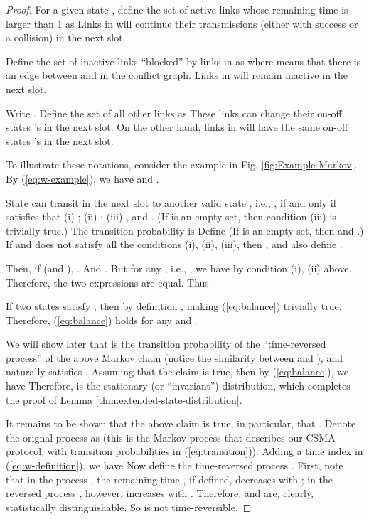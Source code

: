 \documentclass{IEEEtran}
\begin{document}
\begin{proof}
For a given state , define
the set of active links whose remaining time is larger than 1 as
Links in  will continue their transmissions (either with
success or a collision) in the next slot. 

Define the set of inactive links {}``blocked'' by links in 
as
where  means that there is an edge between  and 
in the conflict graph. Links in  will remain inactive
in the next slot. 

Write . Define the
set of all other links as
These links can change their on-off states 's in the next
slot. On the other hand, links in  will have the
same on-off states 's in the next slot.

To illustrate these notations, consider the example in Fig. \ref{fig:Example-Markov}.
By (\ref{eq:w-example}), we have 
and .

State  can transit in the next slot to another valid state ,
i.e., , if and only if  satisfies that (i) ;
(ii) ;
(iii) ,
and . (If 
is an empty set, then condition (iii) is trivially true.) The transition
probability is 
Define
(If  is an empty set, then  and .)
If  and  does not satisfy all the conditions (i), (ii), (iii),
then , and also define . 

Then, if  (and ), .
And .
But for any , i.e., , we have
 by condition (i), (ii) above. Therefore,
the two expressions are equal. Thus


If two states  satisfy , then by definition ,
making (\ref{eq:balance}) trivially true. Therefore, (\ref{eq:balance})
holds for any  and .

We will show later that  is the transition probability
of the {}``time-reversed process'' of the above Markov chain (notice
the similarity between  and ), and naturally
satisfies . Assuming that the claim is
true, then by (\ref{eq:balance}), we have 
Therefore,  is the stationary (or {}``invariant'') distribution,
which completes the proof of Lemma \ref{thm:extended-state-distribution}.

It remains to be shown that the above claim is true, in particular,
that . Denote the orignal process as 
(this is the Markov process that describes our CSMA protocol, with
transition probabilities  in (\ref{eq:transition})).
Adding a time index in (\ref{eq:w-definition}), we have 
Now define the time-reversed process .
First, note that in the process , the remaining time ,
if defined, decreases with ; in the reversed process ,
however,  increases with . Therefore, 
and  are, clearly, statistically distinguishable.
So  is not time-reversible.


\end{proof}
\end{document}
